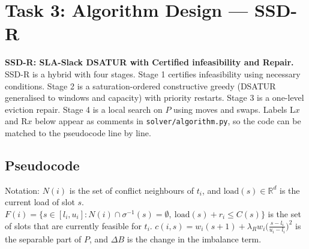 \section{Task 3: Algorithm Design --- SSD-R}

\textbf{SSD-R: SLA-Slack DSATUR with Certified infeasibility and Repair.}
SSD-R is a hybrid with four stages. Stage 1 certifies infeasibility using
necessary conditions. Stage 2 is a saturation-ordered constructive greedy
(DSATUR generalised to windows and capacity) with priority restarts.
Stage 3 is a one-level eviction repair. Stage 4 is a local search on $P$
using moves and swaps. Labels L$x$ and R$x$ below appear as comments in
\texttt{solver/algorithm.py}, so the code can be matched to the pseudocode
line by line.

\subsection{Pseudocode}
Notation: $N(i)$ is the set of conflict neighbours of $t_i$, and
$\text{load}(s)\in\mathbb{R}^d$ is the current load of slot $s$.
$F(i)=\{s\in[l_i,u_i] : N(i)\cap\sigma^{-1}(s)=\emptyset,\ \text{load}(s)+r_i\le C(s)\}$
is the set of slots that are currently feasible for $t_i$.
$c(i,s) = w_i(s+1) + \lambda_R w_i\big(\tfrac{s-l_i}{u_i-l_i}\big)^2$ is the
separable part of $P$, and $\Delta B$ is the change in the imbalance term.

